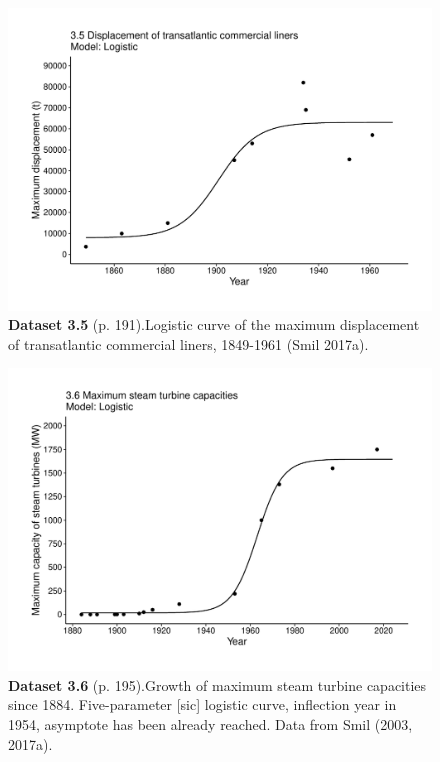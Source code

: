 \documentclass[aps,rmp,preprint,superscriptaddress,10pt,onecolumn]{article}
\begin{document}
\clearpage
\begin{figure}[h]
\includegraphics[width=\textwidth]{output/figs-ggplot/3.5.pdf}
\caption*{\textbf{Dataset 3.5} (p. 191).Logistic curve of the maximum displacement of transatlantic commercial liners, 1849-1961 (Smil 2017a).}
\end{figure}
	
\clearpage
\begin{figure}[h]
\includegraphics[width=\textwidth]{output/figs-ggplot/3.6.pdf}
\caption*{\textbf{Dataset 3.6} (p. 195).Growth of maximum steam turbine capacities since 1884. Five-parameter [sic] logistic curve, inflection year in 1954, asymptote has been already reached. Data from Smil (2003, 2017a).}
\end{figure}
	
\end{document}
